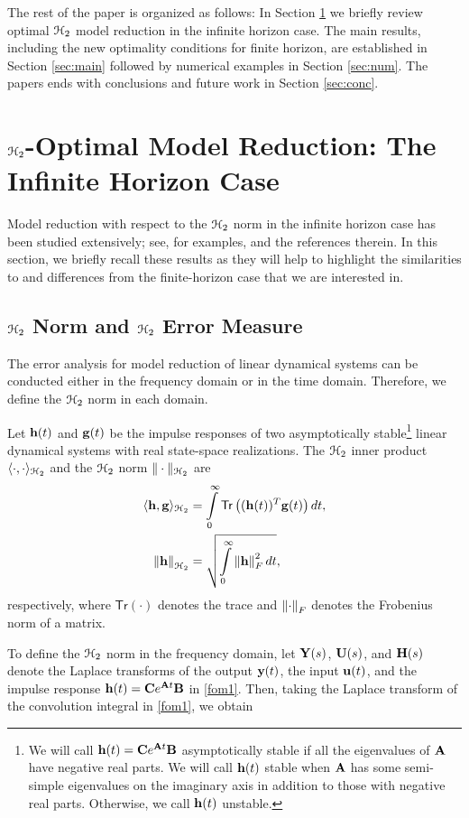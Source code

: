 \documentclass[twocolumn]{autart}
\begin{document}
The rest of the paper is organized as follows: In Section  \ref{sec:intro} we briefly review optimal  $\EuScript{H}_2$ model reduction in the infinite horizon case. The main results, including the new optimality conditions for finite horizon, are established in Section \ref{sec:main} followed by numerical examples in Section \ref{sec:num}. The papers ends with conclusions and future work in Section \ref{sec:conc}.

\section{$\EuScript{H}_2$-Optimal Model Reduction: The Infinite Horizon Case} \label{sec:intro}
Model reduction with respect to the $\EuScript{H}_2$ norm in the infinite horizon case has been studied extensively; see, for examples, \cite{BarCO91,BryC90,FulO90,MeiL67,Hal92,HylB85,SpaMM92,YanL99,LepMPV91,GugBA08,AniBGA13,Wil70,vuillemin2014poles,CasL18,panzer2013,gerstner2007hom,VanGA08,breiten2013near} and the references therein. 
In this section, we briefly recall these results as they will help to highlight the similarities to and differences from the finite-horizon case that we are interested in.


\subsection{$\EuScript{H}_2$ Norm and $\EuScript{H}_2$ Error Measure}
The error analysis for model reduction of linear dynamical systems can be conducted either in the frequency domain or in the time domain. Therefore, we define the $\EuScript{H}_2$ norm in each domain. 
\begin{Definition}
Let $\mathbf{h}(t)$ and $\mathbf{g}(t)$ be the impulse responses of two asymptotically stable\footnote{We will call
$\mathbf{h}(t) = \mathbf{C} e^{\mathbf{A} t} \mathbf{B}$ asymptotically stable if all the eigenvalues of $\mathbf{A}$ have negative real parts. We will call 
$\mathbf{h}(t)$ stable when $\mathbf{A}$ has some semi-simple eigenvalues on the imaginary axis in addition to those with negative real parts. Otherwise, we call  $\mathbf{h}(t)$ unstable.}
linear dynamical systems with real state-space realizations.
The $\EuScript{H}_2$ inner product $\langle \cdot, \cdot \rangle_{\EuScript{H}_2}$ and the $\EuScript{H}_2$ norm $\| \cdot \|_{\EuScript{H}_2}$  are 
\begin{align*}
\langle \h, \g \rangle_{\ch_2} &=\int_0^\infty \mathsf{Tr}\left((\h(t))^T \g(t)\right) dt,\\
\norm{\h}_{\ch_2}&= \sqrt{ \int_0^\infty \norm{\h}_F^2 dt },
\end{align*} 
respectively, where $ \mathsf{Tr}(\cdot)$ denotes the trace and $\left\lVert\cdot\right\rVert_F$ denotes the Frobenius norm of a matrix.
\end{Definition}
To define the $\EuScript{H}_2$ norm in the frequency domain, let $\mathbf{Y}(s)$, $\mathbf{U}(s)$, and $\mathbf{H}(s)$ denote the Laplace transforms of 
 the output $\mathbf{y}(t)$, the input $\mathbf{u}(t)$, and the impulse response $\mathbf{h}(t) = \mathbf{C} e^{\mathbf{A} t}\mathbf{B}$
in \eqref{fom1}. Then, taking the Laplace transform of the convolution integral in  \eqref{fom1}, we obtain
\end{document}
